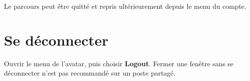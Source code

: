 Le parcours peut être quitté et repris ultérieurement depuis le menu du compte.


\section{Se déconnecter}

Ouvrir le menu de l'avatar, puis choisir \textbf{Logout}. Fermer une fenêtre sans
se déconnecter n'est pas recommandé sur un poste partagé.
